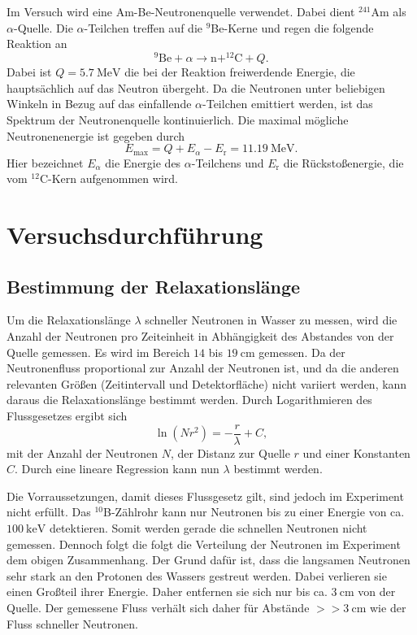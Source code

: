 Im Versuch wird eine Am-Be-Neutronenquelle verwendet. Dabei dient $^{241}$Am als $\alpha$-Quelle. Die $\alpha$-Teilchen treffen auf die $^{9}$Be-Kerne und regen die folgende Reaktion an
\begin{equation}
 ^{9}\textrm{Be} + \alpha  \longrightarrow \textrm{n} + ^{12}\textrm{C} + Q.
\end{equation}
Dabei ist $Q=\SI{5,7}{\mega\electronvolt}$ die bei der Reaktion freiwerdende Energie, die hauptsächlich auf das Neutron übergeht. Da die Neutronen unter beliebigen Winkeln in Bezug auf das einfallende $\alpha$-Teilchen emittiert werden, ist das Spektrum der Neutronenquelle kontinuierlich.
Die maximal mögliche Neutronenenergie ist gegeben durch
\begin{equation}
 E_{\textrm{max}} = Q + E_{\alpha} - E_{\textrm{r}} = \SI{11,19}{\mega\electronvolt}.
\end{equation}
Hier bezeichnet $E_{\alpha}$ die Energie des $\alpha$-Teilchens und $E_{\textrm{r}}$ die Rückstoßenergie, die vom $^{12}$C-Kern aufgenommen wird.

\section{Versuchsdurchführung}

\subsection{Bestimmung der Relaxationslänge}

Um die Relaxationslänge $\lambda$ schneller Neutronen in Wasser zu messen, wird die Anzahl der Neutronen pro Zeiteinheit in Abhängigkeit des Abstandes von der Quelle gemessen. Es wird im Bereich $14$ bis $\SI{19}{\centi\metre}$ gemessen.
Da der Neutronenfluss proportional zur Anzahl der Neutronen ist, und da die anderen relevanten Größen (Zeitintervall und Detektorfläche) nicht variiert werden, kann daraus die Relaxationslänge bestimmt werden. Durch Logarithmieren des Flussgesetzes ergibt sich
\begin{equation}
 \ln\left(Nr^{2}\right) = -\frac{r}{\lambda} + C,
\end{equation}
mit der Anzahl der Neutronen $N$, der Distanz zur Quelle $r$ und einer Konstanten $C$. Durch eine lineare Regression kann nun $\lambda$ bestimmt werden.

Die Vorraussetzungen, damit dieses Flussgesetz gilt, sind jedoch im Experiment nicht erfüllt. Das $^{10}$B-Zählrohr kann nur Neutronen bis zu einer Energie von ca. $\SI{100}{\kilo\electronvolt}$ detektieren. Somit werden gerade die schnellen Neutronen nicht gemessen. Dennoch folgt die folgt die Verteilung der Neutronen im Experiment dem obigen Zusammenhang.
Der Grund dafür ist, dass die langsamen Neutronen sehr stark an den Protonen des Wassers gestreut werden. Dabei verlieren sie einen Großteil ihrer Energie. Daher entfernen sie sich nur bis ca. $\SI{3}{\centi\metre}$ von der Quelle. 
Der gemessene Fluss verhält sich daher für Abstände $>>\SI{3}{\centi\metre}$ wie der Fluss schneller Neutronen.

